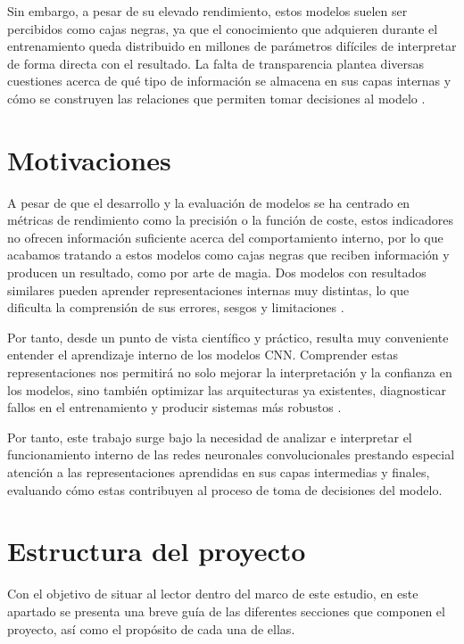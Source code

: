 Sin embargo, a pesar de su elevado rendimiento, estos modelos suelen ser percibidos como cajas negras, ya que el conocimiento que adquieren durante el entrenamiento queda distribuido en millones de parámetros difíciles de interpretar de forma directa con el resultado. La falta de transparencia plantea diversas cuestiones acerca de qué tipo de información se almacena en sus capas internas y cómo se construyen las relaciones que permiten tomar decisiones al modelo \cite{dl__goodfellow_2016}.

\section{Motivaciones}

A pesar de que el desarrollo y la evaluación de modelos se ha centrado en métricas de rendimiento como la precisión o la función de coste, estos indicadores no ofrecen información suficiente acerca del comportamiento interno, por lo que acabamos tratando a estos modelos como cajas negras que reciben información y producen un resultado, como por arte de magia. Dos modelos con resultados similares pueden aprender representaciones internas muy distintas, lo que dificulta la comprensión de sus errores, sesgos y limitaciones \cite{dl_python__chollet_2021}.

Por tanto, desde un punto de vista científico y práctico, resulta muy conveniente entender el aprendizaje interno de los modelos CNN. Comprender estas representaciones nos permitirá no solo mejorar la interpretación y la confianza en los modelos, sino también optimizar las arquitecturas ya existentes, diagnosticar fallos en el entrenamiento y producir sistemas más robustos \cite{nn_dl__michael_nielsen_2015, nn_fundamentals__thakur_2021}.

Por tanto, este trabajo surge bajo la necesidad de analizar e interpretar el funcionamiento interno de las redes neuronales convolucionales prestando especial atención a las representaciones aprendidas en sus capas intermedias y finales, evaluando cómo estas contribuyen al proceso de toma de decisiones del modelo.

\section{Estructura del proyecto}

Con el objetivo de situar al lector dentro del marco de este estudio, en este apartado se presenta una breve guía de las diferentes secciones que componen el proyecto, así como el propósito de cada una de ellas.

